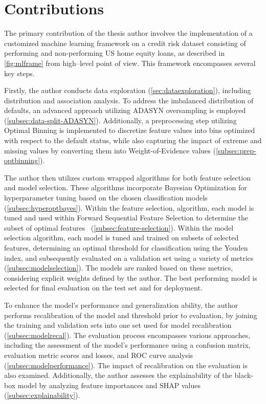 \section{Contributions}
\label{sec:contributions}
The primary contribution of the thesis author involves the implementation of a customized machine learning framework on a credit risk dataset consisting of performing and non-performing US home equity loans, as described in \autoref{fig:mlframe} from high--level point of view. This framework encompasses several key steps.


Firstly, the author conducts data exploration (\autoref{sec:dataexploration}), including distribution and association analysis. To address the imbalanced distribution of defaults, an advanced approach utilizing ADASYN oversampling is employed (\autoref{subsec:data-split-ADASYN}).
Additionally, a preprocessing step utilizing Optimal Binning is implemented to discretize feature values into bins optimized with respect to the default status, while also capturing the impact of extreme and missing values by converting them into Weight-of-Evidence values (\autoref{subsec:prep-optbinning}).


The author then utilizes custom wrapped algorithms for both feature selection and model selection.
These algorithms incorporate Bayesian Optimization for hyperparameter tuning based on the chosen classification models (\autoref{subsec:hyperoptbayes}).
Within the feature selection, algorithm, each model is tuned and used within Forward Sequential Feature Selection to determine the subset of optimal features  (\autoref{subsec:feature-selection}).
Within the model selection algorithm, each model is tuned and trained on subsets of selected features, determining an optimal threshold for classification using the Youden index, and subsequently evaluated on a validation set using a variety of metrics (\autoref{subsec:modelselection}).
The models are ranked based on these metrics, considering explicit weights defined by the author.
The best performing model is selected for final evaluation on the test set and for deployment.


To enhance the model's performance and generalization ability, the author performs recalibration of the model and threshold prior to evaluation, by joining the training and validation sets into one set used for model recalibration (\autoref{subsec:modelrecal}).
The evaluation process encompasses various approaches, including the assessment of the model's performance using a confusion matrix, evaluation metric scores and losses, and ROC curve analysis (\autoref{subsec:modelperformance}).
The impact of recalibration on the evaluation is also examined.
Additionally, the author assesses the explainability of the black-box model by analyzing feature importances and SHAP values (\autoref{subsec:explainability}).


